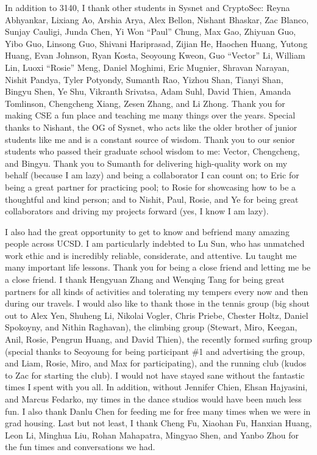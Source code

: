 \begin{acknowledgements}
In addition to 3140, I thank other students in Sysnet and CryptoSec: Reyna Abhyankar, Lixiang Ao, Arshia Arya, Alex Bellon, Nishant Bhaskar, Zac Blanco, Sunjay Cauligi, Junda Chen, Yi Won ``Paul'' Chung, Max Gao, Zhiyuan Guo, Yibo Guo, Linsong Guo, Shivani Hariprasad, Zijian He, Haochen Huang, Yutong Huang, Evan Johnson, Ryan Kosta, Seoyoung Kweon, Guo ``Vector'' Li, William Lin, Luoxi ``Rosie'' Meng, Daniel Moghimi, Eric Mugnier, Shravan Narayan, Nishit Pandya, Tyler Potyondy, Sumanth Rao, Yizhou Shan, Tianyi Shan, Bingyu Shen, Ye Shu, Vikranth Srivatsa, Adam Suhl, David Thien, Amanda Tomlinson, Chengcheng Xiang, Zesen Zhang, and Li Zhong.
Thank you for making CSE a fun place and teaching me many things over the years. Special thanks to Nishant, the OG of Sysnet, who acts like the older brother of junior students like me and is a constant source of wisdom. Thank you to our senior students who passed their graduate school wisdom to me: Vector, Chengcheng, and Bingyu. Thank you to Sumanth for delivering high-quality work on my behalf (because I am lazy) and being a collaborator I can count on; to Eric for being a great partner for practicing pool; to Rosie for showcasing how to be a thoughtful and kind person; and to Nishit, Paul, Rosie, and Ye for being great collaborators and driving my projects forward (yes, I know I am lazy).

I also had the great opportunity to get to know and befriend many amazing people across UCSD. I am particularly indebted to Lu Sun, who has unmatched work ethic and is incredibly reliable, considerate, and attentive. Lu taught me many important life lessons. Thank you for being a close friend and letting me be a close friend. I thank Hengyuan Zhang and Wenqing Tang for being great partners for all kinds of activities and tolerating my tempers every now and then during our travels. I would also like to thank those in the tennis group (big shout out to Alex Yen, Shuheng Li, Nikolai Vogler, Chris Priebe, Chester Holtz, Daniel Spokoyny, and Nithin Raghavan), the climbing group (Stewart, Miro, Keegan, Anil, Rosie, Pengrun Huang, and David Thien), the recently formed surfing group (special thanks to Seoyoung for being participant \#1 and advertising the group, and Liam, Rosie, Miro, and Max for participating), and the running club (kudos to Zac for starting the club). I would not have stayed sane without the fantastic times I spent with you all. In addition, without Jennifer Chien, Ehsan Hajyasini, and Marcus Fedarko, my times in the dance studios would have been much less fun. I also thank Danlu Chen for feeding me for free many times when we were in grad housing. Last but not least, I thank Cheng Fu, Xiaohan Fu, Hanxian Huang, Leon Li,  Minghua Liu, Rohan Mahapatra, Mingyao Shen, and Yanbo Zhou for the fun times and conversations we had.


\end{acknowledgements}
